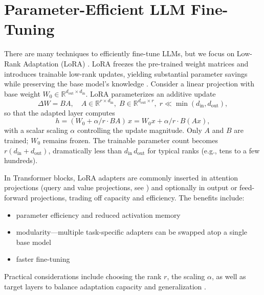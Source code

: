 % 


\section{Parameter-Efficient LLM Fine-Tuning}

There are many techniques to efficiently fine-tune LLMs, but we focus on Low-Rank Adaptation (LoRA) \cite{hu2021lora}.
LoRA freezes the pre-trained weight matrices and introduces trainable low-rank updates, yielding substantial parameter savings while preserving the base model’s knowledge \cite{hu2021lora}. 
Consider a linear projection with base weight \(W_0 \in \mathbb{R}^{d_{\text{out}}\times d_{\text{in}}}\). 
LoRA parameterizes an additive update
\[
\Delta W = B A,\quad A \in \mathbb{R}^{r \times d_{\text{in}}},\; B \in \mathbb{R}^{d_{\text{out}} \times r},\; r \ll \min(d_{\text{in}}, d_{\text{out}}),
\]
so that the adapted layer computes
\[
h = (W_0 + \alpha / r \cdot B A)\, x = W_0 x + \alpha / r \cdot B (A x),
\]
with a scalar scaling \(\alpha\) controlling the update magnitude. Only \(A\) and \(B\) are trained; \(W_0\) remains frozen. The trainable parameter count becomes \(r(d_{\text{in}} + d_{\text{out}})\), dramatically less than \(d_{\text{in}}\, d_{\text{out}}\) for typical ranks (e.g., tens to a few hundreds).

In Transformer blocks, LoRA adapters are commonly inserted in attention projections (query and value projections, see \cite{hu2021lora}) and optionally in output or feed-forward projections, trading off capacity and efficiency. 
The benefits include: 
\begin{itemize}
    \item parameter efficiency and reduced activation memory
    \item modularity—multiple task-specific adapters can be swapped atop a single base model
    \item faster fine-tuning
\end{itemize}
Practical considerations include choosing the rank \(r\), the scaling \(\alpha\), as well as target layers to balance adaptation capacity and generalization \cite{hu2021lora}.


